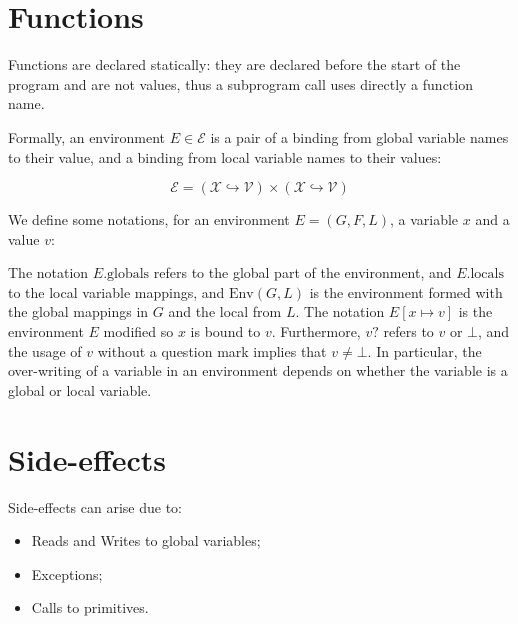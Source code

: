 \documentclass{book}
\newcommand\field[1]{.\text{#1}}
\newcommand\globals[0]{\field{globals}}
\newcommand\locals[0]{\field{locals}}
\newcommand\X[0]{\mathcal{X}}
\DeclareMathOperator{\dom}{dom}
\begin{document}
\section{Functions}
Functions are declared statically: they are declared before the start of the
program and are not values, thus a subprogram call uses directly a function name. 

Formally, an environment $E \in \mathcal{E}$ is a pair of a binding from global
variable names to their value, and a binding from local variable names to their
values:

%
\[
  \mathcal{E} = \left( \X \hookrightarrow \mathcal{V} \right)
         \times \left( \X \hookrightarrow \mathcal{V} \right)
\]

We define some notations, for an environment $E = (G, F, L)$, a variable $x$
and a value $v$:
%
%
The notation $E\globals$ refers to the global part of the environment, and
$E\locals$ to the local variable mappings, and $\text{Env} (G, L)$ is the
environment formed with the global mappings in $G$ and the local from $L$.
%
The notation $E[x \mapsto v]$ is the environment $E$ modified so $x$ is bound
to $v$.
%
Furthermore, $v?$ refers to $v$ or $\bot$, and the usage of $v$ without a
question mark implies that $v \neq \bot$.
%
In particular, the over-writing of a variable in an environment depends on
whether the variable is a global or local variable.

\section{Side-effects}

Side-effects can arise due to:
\begin{itemize}
\item Reads and Writes to global variables;
\item Exceptions;
\item Calls to primitives.
\end{itemize}
\end{document}

